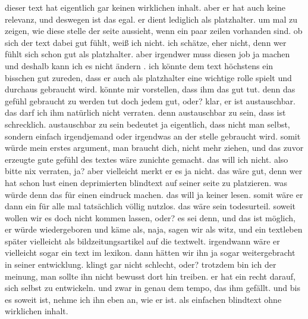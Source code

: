 \documentclass[conference]{IEEEtran}
\begin{document}
dieser text hat eigentlich gar keinen wirklichen inhalt. aber er hat auch keine relevanz, und deswegen ist das egal. er dient lediglich als platzhalter. um mal zu zeigen, wie diese stelle der seite aussieht, wenn ein paar zeilen vorhanden sind. ob sich der text dabei gut fühlt, weiß ich nicht. ich schätze, eher nicht, denn wer fühlt sich schon gut als platzhalter. aber irgendwer muss diesen job ja machen und deshalb kann ich es nicht ändern . ich könnte dem text höchstens ein bisschen gut zureden, dass er auch als platzhalter eine wichtige rolle spielt und durchaus gebraucht wird. könnte mir vorstellen, dass ihm das gut tut. denn das gefühl gebraucht zu werden tut doch jedem gut, oder? klar, er ist austauschbar. das darf ich ihm natürlich nicht verraten. denn austauschbar zu sein, dass ist schrecklich. austauschbar zu sein bedeutet ja eigentlich, dass nicht man selbst, sondern einfach irgendjemand oder irgendwas an der stelle gebraucht wird. somit würde mein erstes argument, man braucht dich, nicht mehr ziehen, und das zuvor erzeugte gute gefühl des textes wäre zunichte gemacht. das will ich nicht. also bitte nix verraten, ja? aber vielleicht merkt er es ja nicht. das wäre gut, denn wer hat schon lust einen deprimierten blindtext auf seiner seite zu platzieren. was würde denn das für einen eindruck machen. das will ja keiner lesen. somit wäre er dann ein für alle mal tatsächlich völlig nutzlos. das wäre sein todesurteil. soweit wollen wir es doch nicht kommen lassen, oder? es sei denn, und das ist möglich, er würde wiedergeboren und käme als, naja, sagen wir als witz, und ein textleben später vielleicht als bildzeitungsartikel auf die textwelt. irgendwann wäre er vielleicht sogar ein text im lexikon. dann hätten wir ihn ja sogar weitergebracht in seiner entwicklung. klingt gar nicht schlecht, oder? trotzdem bin ich der meinung, man sollte ihn nicht bewusst dort hin treiben. er hat ein recht darauf, sich selbst zu entwickeln. und zwar in genau dem tempo, das ihm gefällt. und bis es soweit ist, nehme ich ihn eben an, wie er ist. als einfachen blindtext ohne wirklichen inhalt.
\end{document}

